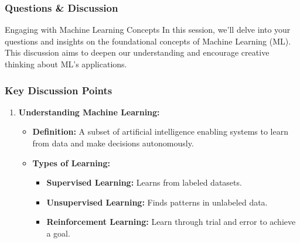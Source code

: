 \documentclass[aspectratio=169]{beamer}
\begin{document}
\begin{frame}[fragile]
    \frametitle{Questions \& Discussion}
    \begin{block}{Engaging with Machine Learning Concepts}
        In this session, we'll delve into your questions and insights on the foundational concepts of Machine Learning (ML). 
        This discussion aims to deepen our understanding and encourage creative thinking about ML's applications.
    \end{block}
\end{frame}

\begin{frame}[fragile]
    \frametitle{Key Discussion Points}

    \begin{enumerate}
        \item \textbf{Understanding Machine Learning:}
        \begin{itemize}
            \item \textbf{Definition:} A subset of artificial intelligence enabling systems to learn from data and make decisions autonomously.
            \item \textbf{Types of Learning:}
            \begin{itemize}
                \item \textbf{Supervised Learning:} Learns from labeled datasets.
                \item \textbf{Unsupervised Learning:} Finds patterns in unlabeled data.
                \item \textbf{Reinforcement Learning:} Learn through trial and error to achieve a goal.
            \end{itemize}
        \end{itemize}
    \end{enumerate}
\end{frame}
\end{document}
